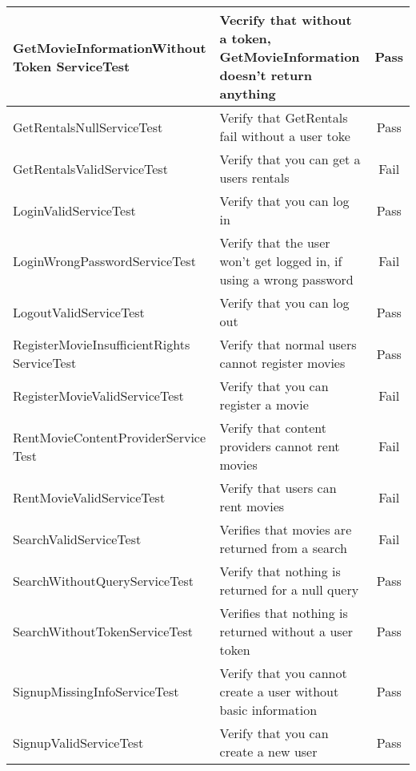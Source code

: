 \begin{centering}
\begin{longtable}{| p{5 cm} | p{9 cm} | c |}
\hline
GetMovieInformationWithout Token ServiceTest & Vecrify that without a token, GetMovieInformation doesn't return anything & Pass\\
\hline
GetRentalsNullServiceTest & Verify that GetRentals fail without a user toke & Pass\\
\hline
GetRentalsValidServiceTest & Verify that you can get a users rentals & Fail\\
\hline
LoginValidServiceTest & Verify that you can log in & Pass\\
\hline
LoginWrongPasswordServiceTest & Verify that the user won't get logged in, if using a wrong password & Fail\\
\hline
LogoutValidServiceTest & Verify that you can log out & Pass\\
\hline
RegisterMovieInsufficientRights ServiceTest & Verify that normal users cannot register movies & Pass\\
\hline
RegisterMovieValidServiceTest & Verify that you can register a movie & Fail\\
\hline
RentMovieContentProviderService Test & Verify that content providers cannot rent movies & Fail\\
\hline
RentMovieValidServiceTest & Verify that users can rent movies & Fail\\
\hline
SearchValidServiceTest & Verifies that movies are returned from a search & Fail\\
\hline
SearchWithoutQueryServiceTest & Verify that nothing is returned for a null query & Pass\\
\hline
SearchWithoutTokenServiceTest & Verifies that nothing is returned without a user token & Pass\\
\hline
SignupMissingInfoServiceTest & Verify that you cannot create a user without basic information & Pass\\
\hline
SignupValidServiceTest & Verify that you can create a new user & Pass\\
\hline
\end{longtable}
\end{centering}

